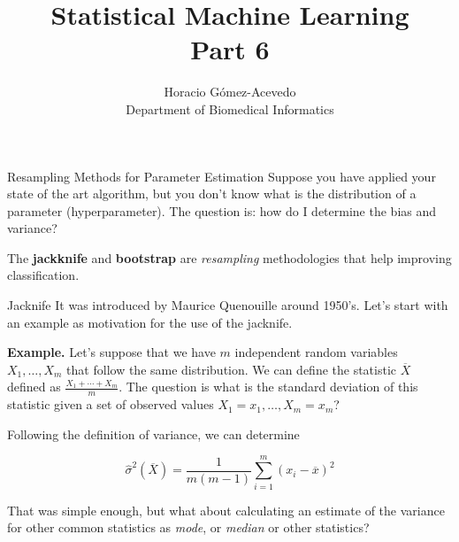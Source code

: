 \documentclass{beamer}
\title{Statistical Machine Learning\\ Part 6}
\author{Horacio G\'omez-Acevedo\\ Department of Biomedical Informatics}
\begin{document}
	\begin{frame}[plain]
		\maketitle
	\end{frame}


\begin{frame}{Resampling Methods for Parameter Estimation}
	Suppose you have applied your state of the art algorithm, but you don't know what is the distribution of a parameter (hyperparameter). The question is: how do I determine the bias and variance?
	
	The {\bf jackknife} and {\bf bootstrap} are {\it resampling} methodologies that help improving classification.
	
	
	 
\end{frame}

\begin{frame}{Jacknife}
	It was introduced by Maurice Quenouille around 1950's.  Let's start with an example as motivation for the use of the jacknife. 
	
	{\bf Example. } Let's suppose that we have 
	$m$ independent random variables $X_1,\ldots, X_m$ that follow the same distribution. We can define the statistic $\overline{X}$ defined as $\frac{X_1 + \cdots + X_m}{m}$. The question is what is the standard deviation of this statistic given a set of observed values $X_1=x_1,\ldots, X_m=x_m$?
	
	Following the definition of variance, we can determine
	
	\begin{equation}
		\widehat{\sigma}^2(\overline{X})= \frac{1}{m(m-1)} \sum_{i=1}^m (x_i - \overline{x})^2
		\label{eq:stdev}
	\end{equation}
	
	That was simple enough, but what about calculating an estimate of the variance for other common statistics as  {\it mode}, or {\it median} or other statistics?
	
\end{frame}
\end{document}
